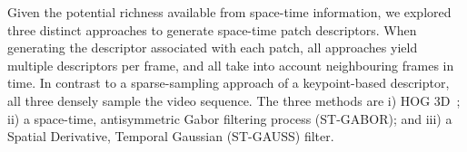 

Given the potential richness available from space-time information, we explored three distinct approaches to generate space-time patch descriptors.  When generating the descriptor associated with each patch, all  approaches yield multiple descriptors per frame, and all take into account neighbouring frames in time.  In contrast to a sparse-sampling approach of a keypoint-based descriptor, all three densely sample the video sequence.  The three methods are i) HOG 3D~\cite{Klaser2008}; ii) a space-time, antisymmetric Gabor filtering process (ST-GABOR); and iii) a Spatial Derivative, Temporal Gaussian (ST-GAUSS) filter.\\

